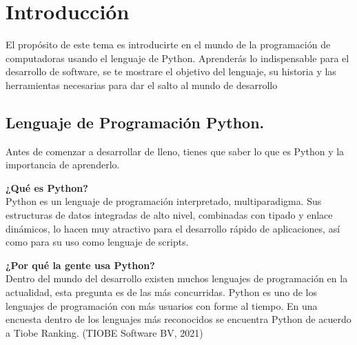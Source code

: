 \chapter{Introducción}
El propósito de este tema es introducirte en el mundo de la programación de computadoras
usando el lenguaje de Python. Aprenderás lo indispensable para el desarrollo de software,
se te mostrare el objetivo del lenguaje, su historia y las herramientas necesarias para dar el
salto al mundo de desarrollo

\section{Lenguaje de Programación Python.}

Antes de comenzar a desarrollar de lleno, tienes que saber lo que es Python y la
importancia de aprenderlo.

\textbf{¿Qué es Python?}\\

Python es un lenguaje de programación interpretado, multiparadigma. Sus estructuras de
datos integradas de alto nivel, combinadas con tipado y enlace dinámicos, lo hacen muy
atractivo para el desarrollo rápido de aplicaciones, así como para su uso como lenguaje de
scripts.

\textbf{¿Por qué la gente usa Python?}\\

Dentro del mundo del desarrollo existen muchos lenguajes de programación en la
actualidad, esta pregunta es de las más concurridas. Python es uno de los lenguajes de
programación con más usuarios con forme al tiempo. En una encuesta dentro de los
lenguajes más reconocidos se encuentra Python de acuerdo a Tiobe Ranking. (TIOBE
Software BV, 2021)

